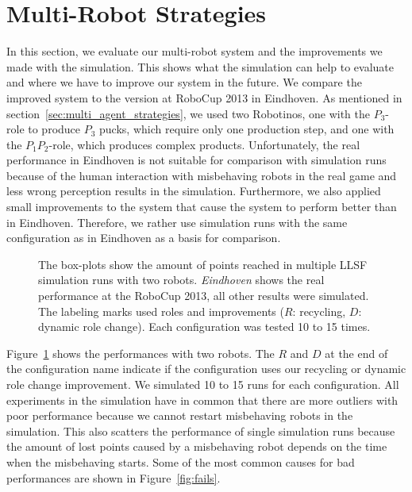 \section{Multi-Robot Strategies}
\label{sec:multi_robot_strategies}
In this section, we evaluate our multi-robot system and the improvements we made with the simulation. This shows what the simulation can help to evaluate and where we have to improve our system in the future. We compare the improved system to the version at RoboCup 2013 in Eindhoven. As mentioned in section~\ref{sec:multi_agent_strategies}, we used two Robotinos, one with the $P_3$-role to produce $P_3$ pucks, which require only one production step, and one with the $P_1P_2$-role, which produces complex products. Unfortunately, the real performance in Eindhoven is not suitable for comparison with simulation runs because of the human interaction with misbehaving robots in the real game and less wrong perception results in the simulation. Furthermore, we also applied small improvements to the system that cause the system to perform better than in Eindhoven. Therefore, we rather use simulation runs with the same configuration as in Eindhoven as a basis for comparison.
\begin{figure}
  \centering
  \caption{The box-plots show the amount of points reached in multiple LLSF simulation runs with two robots. \textit{Eindhoven} shows the real performance at the RoboCup 2013, all other results were simulated. The labeling marks used roles and improvements ($R$: recycling, $D$: dynamic role change). Each configuration was tested 10 to 15 times.}
  \label{fig:eval_two}
\end{figure}
Figure~\ref{fig:eval_two} shows the performances with two robots. The $R$ and $D$ at the end of the configuration name indicate if the configuration uses our recycling or dynamic role change improvement. We simulated 10 to 15 runs for each configuration. All experiments in the simulation have in common that there are more outliers with poor performance because we cannot restart misbehaving robots in the simulation. This also scatters the performance of single simulation runs because the amount of lost points caused by a misbehaving robot depends on the time when the misbehaving starts. Some of the most common causes for bad performances are shown in Figure~\ref{fig:fails}.
